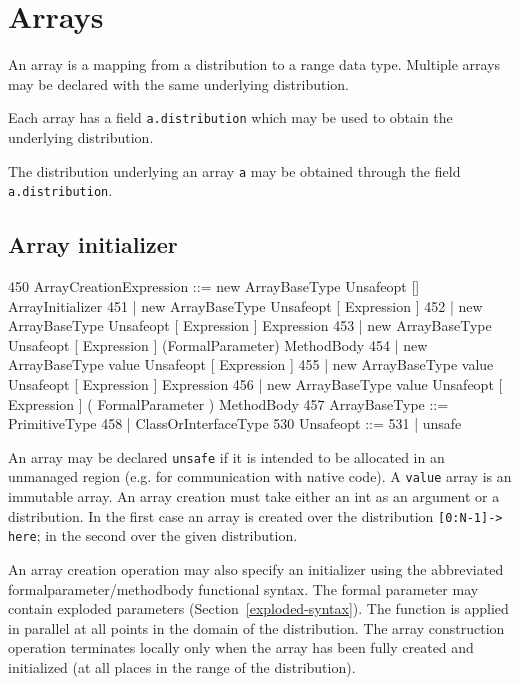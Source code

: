 \chapter{Arrays}\label{XtenArrays}

An array is a mapping from a distribution to a range data
type. Multiple arrays may be declared with the same underlying
distribution. 

Each array has a field {\tt a.distribution} which may be used to
obtain the underlying distribution.

The distribution underlying an array {\tt a} may be obtained through
the field {\tt a.distribution}.



\section{Array initializer}\label{ArrayInitializer}\label{array!creation}

\begin{x10}
450 ArrayCreationExpression ::= 
       new ArrayBaseType Unsafeopt [] 
         ArrayInitializer
451  | new ArrayBaseType Unsafeopt 
       [ Expression ]
452  | new ArrayBaseType Unsafeopt 
       [ Expression ] Expression
453  | new ArrayBaseType Unsafeopt 
       [ Expression ] 
       (FormalParameter) MethodBody
454  | new ArrayBaseType value Unsafeopt 
       [ Expression ]
455  | new ArrayBaseType value Unsafeopt 
       [ Expression ] Expression
456  | new ArrayBaseType value Unsafeopt 
       [ Expression ] 
       ( FormalParameter ) MethodBody
457 ArrayBaseType ::= PrimitiveType
458  | ClassOrInterfaceType
530 Unsafeopt ::=
531  | unsafe
\end{x10}

An array may be declared {\tt unsafe} if it is intended to be
allocated in an unmanaged region (e.g.{} for communication with native
code). A {\tt value} array is an immutable array. An array creation
must take either an int as an argument or a distribution. In the first
case an array is created over the distribution {\tt [0:N-1]-> here};
in the second over the given distribution. 

An array creation operation may also specify an initializer using the
abbreviated formalparameter/methodbody functional syntax. The formal
parameter may contain exploded parameters
(Section~\ref{exploded-syntax}). The function is applied in parallel
at all points in the domain of the distribution. The array
construction operation terminates locally only when the array has been
fully created and initialized (at all places in the range of the
distribution).

